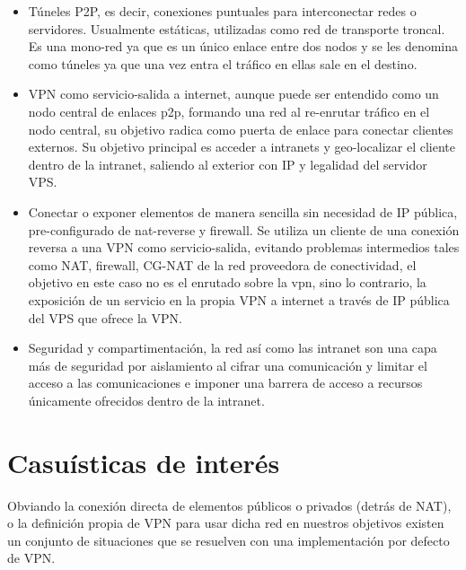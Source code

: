 \begin{itemize}
    \item Túneles P2P, es decir, conexiones puntuales para interconectar redes o servidores. Usualmente estáticas, utilizadas como red de transporte troncal. Es una mono-red  ya que es un único enlace entre dos nodos y se les denomina como túneles ya que una vez entra el tráfico en ellas sale en el destino.
    \item VPN como servicio-salida a internet, aunque puede ser entendido como un nodo central de enlaces p2p, formando una red al re-enrutar tráfico en el nodo central, su objetivo radica como puerta de enlace para conectar clientes externos. Su objetivo principal es acceder a intranets y geo-localizar el cliente dentro de la intranet, saliendo al exterior con IP y legalidad del servidor VPS. 
    \item Conectar o exponer elementos de manera sencilla sin necesidad de IP pública, pre-configurado de nat-reverse y firewall. Se utiliza un cliente de una conexión reversa a una VPN como servicio-salida, evitando problemas intermedios tales como NAT, firewall, CG-NAT\cite{c_cg_nat} de la red proveedora de conectividad, el objetivo en este caso no es el enrutado sobre la vpn, sino lo contrario, la exposición de un servicio en la propia VPN a internet a través de IP pública del VPS que ofrece la VPN.
    \item Seguridad y compartimentación, la red así como las intranet son una capa más de seguridad por aislamiento al cifrar una comunicación y limitar el acceso a las comunicaciones e imponer una barrera de acceso a recursos únicamente ofrecidos dentro de la intranet.
\end{itemize}


\section{Casuísticas de interés}
Obviando la conexión directa de elementos públicos o privados (detrás de NAT), o la definición propia de VPN para usar dicha red en nuestros objetivos existen un conjunto de situaciones que se resuelven con una implementación por defecto de VPN.

